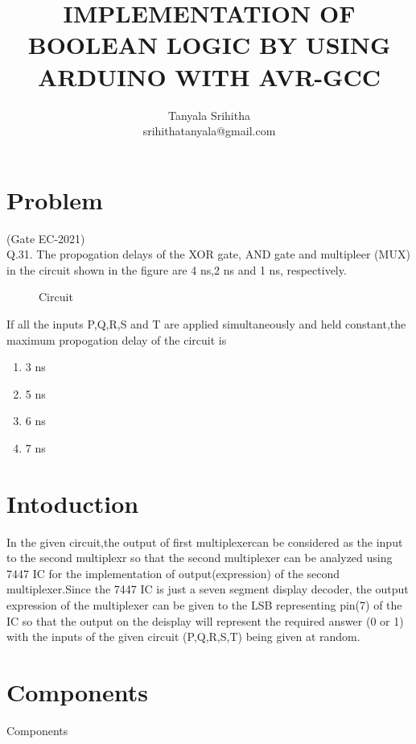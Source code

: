 \documentclass[journal,twocolumn,10pt, a4paper]{article}
\begin{document}
\title{IMPLEMENTATION OF BOOLEAN LOGIC BY USING ARDUINO WITH AVR-GCC}                
\author{Tanyala Srihitha\\srihithatanyala@gmail.com}
\maketitle
\tableofcontents

\section{Problem}

(Gate EC-2021)\\
Q.31. The propogation delays of the XOR gate, AND gate and multipleer (MUX) in the circuit shown in the figure are 4 ns,2 ns and 1 ns, respectively.\\
\begin{figure}[!h]
\begin{center}
\resizebox{0.75\columnwidth}{!}{

}
\end{center}
\caption{Circuit}
\label{fig:circuit}
\end{figure}
If all the inputs P,Q,R,S and T are applied simultaneously and held constant,the maximum propogation delay of the circuit is 
\begin{enumerate}
\item 3 ns \item 5 ns \item 6 ns \item 7 ns
\end{enumerate}

\section{Intoduction}
In the given circuit,the output of first multiplexercan be considered as the input to the second multiplexr so that the second multiplexer can be analyzed using 7447 IC for the implementation of output(expression) of the second multiplexer.Since the 7447 IC is just a seven segment display decoder, the output expression of the multiplexer can be given to the LSB representing pin(7) of the IC so that the output on the deisplay will represent the required answer (0 or 1) with the inputs of the given circuit (P,Q,R,S,T) being given at random.

\section{Components}
\begin{table}[!h]
\centering

\caption{Components}
\label{table:Components}
\end{table}
\end{document}
